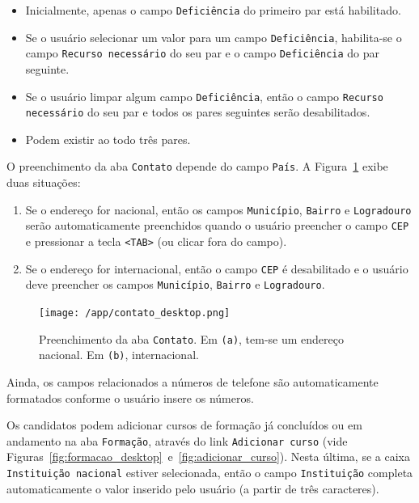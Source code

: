 \documentclass[
  10.5pt,				  %
	openright,			%
	twoside,			  %
  a5paper,
  chapter=TITLE,	%
	section=TITLE,	%
  hyphens,        %
	english,        %
	brazil          %
]{abntex2}
\begin{document}
\begin{itemize}
  \item Inicialmente, apenas o campo \texttt{Deficiência} do primeiro par está habilitado.
  \item Se o usuário selecionar um valor para um campo \texttt{Deficiência}, habilita-se o campo \texttt{Recurso necessário} do seu par e o campo \texttt{Deficiência} do par seguinte.
  \item Se o usuário limpar algum campo \texttt{Deficiência}, então o campo \texttt{Recurso necessário} do seu par e todos os pares seguintes serão desabilitados. 
  \item Podem existir ao todo três pares.
\end{itemize}

O preenchimento da aba \texttt{Contato} depende do campo \texttt{País}. A Figura~\ref{fig:contato_desktop} exibe duas situações: 
%
\begin{enumerate}[label=(\alph*)]
  \item Se o endereço for nacional, então os campos \texttt{Município}, \texttt{Bairro} e \texttt{Logradouro} serão automaticamente preenchidos quando o usuário preencher o campo \texttt{CEP} e pressionar a tecla \texttt{<TAB>} (ou clicar fora do campo).
  \item Se o endereço for internacional, então o campo \texttt{CEP} é desabilitado e o usuário deve preencher os campos \texttt{Município}, \texttt{Bairro} e \texttt{Logradouro}.
\end{enumerate}
%
\begin{figure}[!ht]
  \caption{\label{fig:contato_desktop} Preenchimento da aba \texttt{Contato}. Em \texttt{(a)}, tem-se um endereço nacional. Em \texttt{(b)}, internacional.}
  \begin{center}
    \texttt{[image: /app/contato\_desktop.png]}
  \end{center}
\end{figure}
%
Ainda, os campos relacionados a números de telefone são automaticamente formatados conforme o usuário insere os números.

Os candidatos podem adicionar cursos de formação já concluídos ou em andamento na aba \texttt{Formação}, através do link \texttt{Adicionar curso} (vide Figuras~\ref{fig:formacao_desktop}~e~\ref{fig:adicionar_curso}). Nesta última, se a caixa \texttt{Instituição nacional} estiver selecionada, então o campo \texttt{Instituição} completa automaticamente o valor inserido pelo usuário (a partir de três caracteres).
\end{document}
